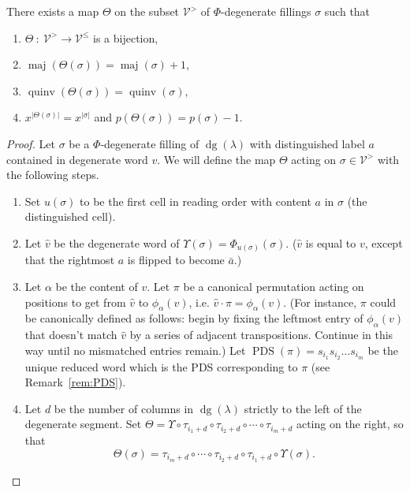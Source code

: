 \documentclass[ALCO,Unicode]{cedram}
\DeclareMathOperator{\PDS}{PDS}
\DeclareMathOperator{\dg}{dg}
\DeclareMathOperator{\maj}{maj}
\DeclareMathOperator{\quinv}{quinv}
\begin{document}
\begin{proposition}\label{thm:Wbijection}
There exists a map $\Theta$ on the subset $\mathcal{V}^{>}$ of $\Phi$-degenerate fillings $\sigma$ such that
\begin{enumerate}[label=(\arabic*)]
\item \label{it2vvt1}$\Theta\ :\ \mathcal{V}^{>} \longrightarrow \mathcal{V}^{\leq}$ is a bijection,
\item \label{it2vvt2} $\maj(\Theta(\sigma)) = \maj(\sigma) +1$,
\item \label{it2vvt3} $\quinv(\Theta(\sigma))=\quinv(\sigma)$,
\item \label{it2vvt4} $x^{|\Theta(\sigma)|}=x^{|\sigma|}$ and $p(\Theta(\sigma))=p(\sigma)-1$.
\end{enumerate}
\end{proposition}
\begin{proof}
Let $\sigma$ be a $\Phi$-degenerate filling of $\dg(\lambda)$ with distinguished label $a$ contained in degenerate word $v$.  We will define the map $\Theta$ acting on $\sigma\in \mathcal{V}^{>}$ with the following steps.
\begin{enumerate}[label=(\roman*)]
\item\label{item:u} Set $u(\sigma)$ to be the first cell in reading order with content $a$ in $\sigma$ (the distinguished cell). 
\item Let $\widehat{v}$ be the degenerate word of $\Upsilon(\sigma)=\Phi_{u(\sigma)}(\sigma)$. ($\widehat{v}$ is equal to $v$, except that the rightmost $a$ is flipped to become $\bar{a}$.)
\item Let $\alpha$ be the content of $v$. 
Let $\pi$ be a canonical permutation acting on positions to get from $\widehat{v}$ to $\phi_{\alpha}(v)$, i.e. $\widehat{v}\cdot \pi=\phi_\alpha(v)$. (For instance, $\pi$ could be canonically defined as follows: begin by fixing the leftmost entry of $\phi_\alpha(v)$ that doesn't match $\widehat{v}$ by a series of adjacent transpositions. Continue in this way until no mismatched entries remain.) Let $\PDS(\pi)=s_{i_1}s_{i_2}\ldots s_{i_m}$ be the unique reduced word which is the PDS corresponding to $\pi$ (see Remark~\ref{rem:PDS}).
\item Let $d$ be the number of columns in $\dg(\lambda)$ strictly to the left of the degenerate segment. Set 
$\Theta = \Upsilon\circ \tau_{i_1+d}\circ \tau_{i_2+d} \circ\cdots \circ \tau_{i_m+d}$ acting on the right, so that
\[
\Theta(\sigma) = \tau_{i_m+d}\circ \cdots\circ\tau_{i_2+d}\circ \tau_{i_1+d}\circ\Upsilon(\sigma).
\]
\end{enumerate}


\end{proof}
\end{document}
